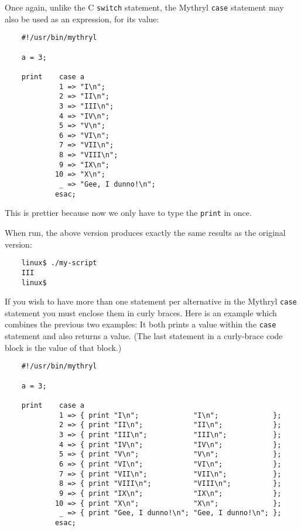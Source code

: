 Once again, unlike the C {\tt switch} statement, the Mythryl {\tt case} statement 
may also be used as an expression, for its value:

\begin{verbatim}
    #!/usr/bin/mythryl

    a = 3;

    print    case a
             1 => "I\n";
             2 => "II\n";
             3 => "III\n";
             4 => "IV\n";
             5 => "V\n";
             6 => "VI\n";
             7 => "VII\n";
             8 => "VIII\n";
             9 => "IX\n";
            10 => "X\n";
             _ => "Gee, I dunno!\n";
            esac;
\end{verbatim}

This is prettier because now we only have to type the {\tt print} in once.

When run, the above version produces exactly the same results as the original version:

\begin{verbatim}
    linux$ ./my-script
    III
    linux$
\end{verbatim}


If you wish to have more than one statement per alternative in the Mythryl 
{\tt case} statement you must enclose them in curly braces.  Here is an 
example which combines the previous two examples:  It both prints a 
value within the {\tt case} statement and also returns a value.  (The 
last statement in a curly-brace code block is the value of that block.)

\begin{verbatim}
    #!/usr/bin/mythryl

    a = 3;

    print    case a
             1 => { print "I\n";             "I\n";             };
             2 => { print "II\n";            "II\n";            };
             3 => { print "III\n";           "III\n";           };
             4 => { print "IV\n";            "IV\n";            };
             5 => { print "V\n";             "V\n";             };
             6 => { print "VI\n";            "VI\n";            };
             7 => { print "VII\n";           "VII\n";           };
             8 => { print "VIII\n";          "VIII\n";          };
             9 => { print "IX\n";            "IX\n";            };
            10 => { print "X\n";             "X\n";             };
             _ => { print "Gee, I dunno!\n"; "Gee, I dunno!\n"; };
            esac;
\end{verbatim}

